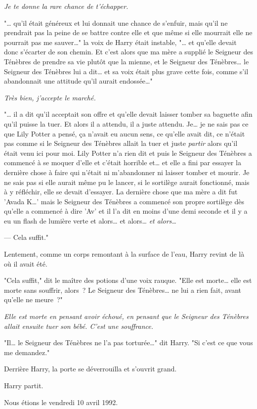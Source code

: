 \emph{Je te donne la rare chance de t'échapper.}

"… qu'il était généreux et lui donnait une chance de s'enfuir, mais qu'il ne prendrait pas la peine de se battre contre elle et que même si elle mourrait elle ne pourrait pas me sauver…" la voix de Harry était instable, "… et qu'elle devait donc s'écarter de son chemin. Et c'est alors que ma mère a supplié le Seigneur des Ténèbres de prendre sa vie plutôt que la mienne, et le Seigneur des Ténèbres… le Seigneur des Ténèbres lui a dit… et sa voix était plus grave cette fois, comme s'il abandonnait une attitude qu'il aurait endossée…"

\emph{Très bien, j'accepte le marché.}

"… il a dit qu'il acceptait son offre et qu'elle devait laisser tomber sa baguette afin qu'il puisse la tuer. Et alors il a attendu, il a juste attendu. Je… je ne sais pas ce que Lily Potter a pensé, ça n'avait eu aucun sens, ce qu'elle avait dit, ce n'était pas comme si le Seigneur des Ténèbres allait la tuer et juste \emph{partir} alors qu'il était venu ici pour moi. Lily Potter n'a rien dit et puis le Seigneur des Ténèbres a commencé à se moquer d'elle et c'était horrible et… et elle a fini par essayer la dernière chose à faire qui n'était ni m'abandonner ni laisser tomber et mourir. Je ne sais pas si elle aurait même pu le lancer, si le sortilège aurait fonctionné, mais à y réfléchir, elle se devait d'essayer. La dernière chose que ma mère a dit fut 'Avada K…' mais le Seigneur des Ténèbres a commencé son propre sortilège dès qu'elle a commencé à dire 'Av' et il l'a dit en moins d'une demi seconde et il y a eu un flash de lumière verte et alors… et alors… \emph{et alors…}

--- Cela suffit."

Lentement, comme un corps remontant à la surface de l'eau, Harry revint de là où il avait été.

"Cela suffit," dit le maître des potions d'une voix rauque. "Elle est morte… elle est morte sans souffrir, alors~? Le Seigneur des Ténèbres… ne lui a rien fait, avant qu'elle ne meure~?"

\emph{Elle est morte en pensant avoir échoué, en pensant que le Seigneur des Ténèbres allait ensuite tuer son bébé. C'est une souffrance.}

"Il… le Seigneur des Ténèbres ne l'a pas torturée…" dit Harry. "Si c'est ce que vous me demandez."

Derrière Harry, la porte se déverrouilla et s'ouvrit grand.

Harry partit.

Nous étions le vendredi 10 avril 1992. 


